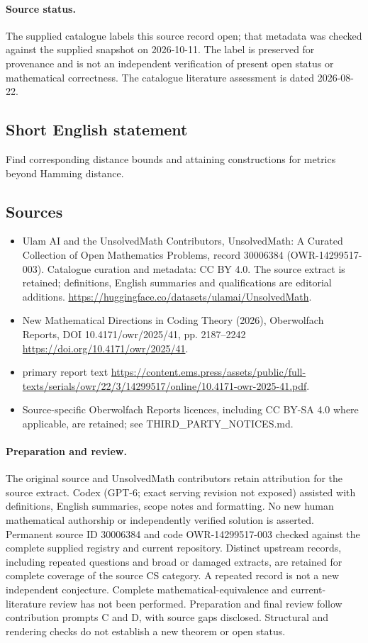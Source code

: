 \documentclass[11pt]{article}
\begin{document}
\paragraph{Source status.}
The supplied catalogue labels this source record open; that metadata was checked against the supplied snapshot on 2026-10-11. The label is preserved for provenance and is not an independent verification of present open status or mathematical correctness. The catalogue literature assessment is dated 2026-08-22.
\subsection{Short English statement}
Find corresponding distance bounds and attaining constructions for metrics beyond Hamming distance.
\subsection{Sources}
\begin{itemize}
\item[S1] Ulam AI and the UnsolvedMath Contributors, UnsolvedMath: A Curated Collection of Open Mathematics Problems, record 30006384 (OWR-14299517-003). Catalogue curation and metadata: CC BY 4.0. The source extract is retained; definitions, English summaries and qualifications are editorial additions.
\url{https://huggingface.co/datasets/ulamai/UnsolvedMath}.
\item[S2] New Mathematical Directions in Coding Theory (2026), Oberwolfach Reports, DOI 10.4171/owr/2025/41, pp. 2187--2242
\url{https://doi.org/10.4171/owr/2025/41}.
\item[S3] primary report text
\url{https://content.ems.press/assets/public/full-texts/serials/owr/22/3/14299517/online/10.4171-owr-2025-41.pdf}.
\item Source-specific Oberwolfach Reports licences, including CC BY-SA 4.0 where applicable, are retained; see THIRD\_PARTY\_NOTICES.md.
\end{itemize}
\paragraph{Preparation and review.}
The original source and UnsolvedMath contributors retain attribution for the source extract. Codex (GPT-6; exact serving revision not exposed) assisted with definitions, English summaries, scope notes and formatting. No new human mathematical authorship or independently verified solution is asserted. Permanent source ID 30006384 and code OWR-14299517-003 checked against the complete supplied registry and current repository. Distinct upstream records, including repeated questions and broad or damaged extracts, are retained for complete coverage of the source CS category. A repeated record is not a new independent conjecture. Complete mathematical-equivalence and current-literature review has not been performed. Preparation and final review follow contribution prompts C and D, with source gaps disclosed. Structural and rendering checks do not establish a new theorem or open status.
\label{end:30006384}
\end{document}
